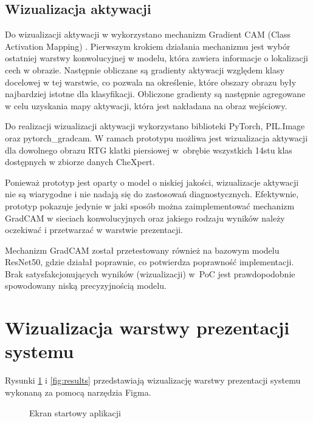 \documentclass{article}
\begin{document}
\subsection{Wizualizacja aktywacji}

Do wizualizacji aktywacji w wykorzystano mechanizm Gradient CAM (Class Activation Mapping) \cite{selvaraju2017gradcam}.
Pierwszym krokiem działania mechanizmu jest wybór ostatniej warstwy konwolucyjnej w modelu, która zawiera informacje o lokalizacji cech w obrazie.
Następnie obliczane są gradienty aktywacji względem klasy docelowej w tej warstwie, co pozwala na określenie, które obszary obrazu były najbardziej istotne dla klasyfikacji.
Obliczone gradienty są następnie agregowane w celu uzyskania mapy aktywacji, która jest nakładana na obraz wejściowy.

Do realizacji wizualizacji aktywacji wykorzystano biblioteki PyTorch, PIL.Image oraz pytorch\_gradcam.
W ramach prototypu możliwa jest wizualizacja aktywacji dla dowolnego obrazu RTG klatki piersiowej w~obrębie wszystkich 14stu klas dostępnych w zbiorze danych CheXpert.

Ponieważ prototyp jest oparty o model o niskiej jakości, wizualizacje aktywacji nie są wiarygodne i nie nadają się do zastosowań diagnostycznych.
Efektywnie, prototyp pokazuje jedynie w jaki sposób można zaimplementować mechanizm GradCAM w sieciach konwolucyjnych oraz jakiego rodzaju wyników należy oczekiwać i przetwarzać w warstwie prezentacji.

Mechanizm GradCAM został przetestowany również na bazowym modelu ResNet50, gdzie działał poprawnie, co potwierdza poprawność implementacji.
Brak satysfakcjonujących wyników (wizualizacji) w~PoC jest prawdopodobnie spowodowany niską precyzyjnością modelu.

\section{Wizualizacja warstwy prezentacji systemu}
Rysunki \ref{fig:start} i \ref{fig:results} przedstawiają wizualizację warstwy prezentacji systemu wykonaną za pomocą narzędzia Figma.

\begin{figure}[H]
  \centering
  \caption{Ekran startowy aplikacji}
  \label{fig:start}
\end{figure}
\end{document}
